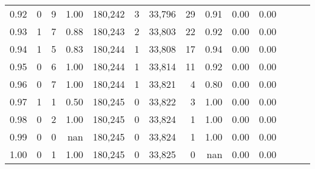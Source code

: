 \begin{tabular}{rrrrrrrrrrrrrr}
0.92 &      0 &    9 &  1.00 &  180,242 &        3 &  33,796 &      29 &  0.91 &  0.00 &      0.00 \\
0.93 &      1 &    7 &  0.88 &  180,243 &        2 &  33,803 &      22 &  0.92 &  0.00 &      0.00 \\
0.94 &      1 &    5 &  0.83 &  180,244 &        1 &  33,808 &      17 &  0.94 &  0.00 &      0.00 \\
0.95 &      0 &    6 &  1.00 &  180,244 &        1 &  33,814 &      11 &  0.92 &  0.00 &      0.00 \\
0.96 &      0 &    7 &  1.00 &  180,244 &        1 &  33,821 &       4 &  0.80 &  0.00 &      0.00 \\
0.97 &      1 &    1 &  0.50 &  180,245 &        0 &  33,822 &       3 &  1.00 &  0.00 &      0.00 \\
0.98 &      0 &    2 &  1.00 &  180,245 &        0 &  33,824 &       1 &  1.00 &  0.00 &      0.00 \\
0.99 &      0 &    0 &   nan &  180,245 &        0 &  33,824 &       1 &  1.00 &  0.00 &      0.00 \\
1.00 &      0 &    1 &  1.00 &  180,245 &        0 &  33,825 &       0 &   nan &  0.00 &      0.00 \\
\bottomrule
\end{tabular}
